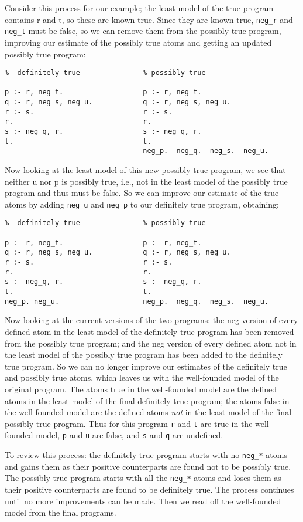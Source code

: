 Consider this process for our example; the least model of the true
program contains r and t, so these are known true.  Since they are
known true, \verb|neg_r| and \verb|neg_t| must be false, so we can
remove them from the possibly true program, improving our estimate of
the possibly true atoms and getting an updated possibly true program:
\begin{verbatim}
%  definitely true               % possibly true

p :- r, neg_t.                   p :- r, neg_t.
q :- r, neg_s, neg_u.            q :- r, neg_s, neg_u.
r :- s.                          r :- s.
r.                               r.
s :- neg_q, r.                   s :- neg_q, r.
t.                               t.
                                 neg_p.  neg_q.  neg_s.  neg_u.
\end{verbatim}
Now looking at the least model of this new possibly true program, we
see that neither u nor p is possibly true, i.e., not in the least
model of the possibly true program and thus must be false.  So we can
improve our estimate of the true atoms by adding \verb|neg_u| and
\verb|neg_p| to our definitely true program, obtaining:
\begin{verbatim}
%  definitely true               % possibly true

p :- r, neg_t.                   p :- r, neg_t.
q :- r, neg_s, neg_u.            q :- r, neg_s, neg_u.
r :- s.                          r :- s.
r.                               r.
s :- neg_q, r.                   s :- neg_q, r.
t.                               t.
neg_p. neg_u.                    neg_p.  neg_q.  neg_s.  neg_u.
\end{verbatim}
Now looking at the current versions of the two programs: the neg
version of every defined atom in the least model of the definitely
true program has been removed from the possibly true program; and the
neg version of every defined atom not in the least model of the
possibly true program has been added to the definitely true program.
So we can no longer improve our estimates of the definitely true and
possibly true atoms, which leaves us with the well-founded model of
the original program.  The atoms true in the well-founded model are
the defined atoms in the least model of the final definitely true
program; the atoms false in the well-founded model are the defined
atoms {\em not} in the least model of the final possibly true program.
Thus for this program \verb|r| and \verb|t| are true in the
well-founded model, \verb|p| and \verb|u| are false, and \verb|s| and
\verb|q| are undefined.

To review this process: the definitely true program starts with no
\verb|neg_*| atoms and gains them as their positive counterparts are
found not to be possibly true.  The possibly true program starts with
all the \verb|neg_*| atoms and loses them as their positive
counterparts are found to be definitely true.  The process continues
until no more improvements can be made.  Then we read off the
well-founded model from the final programs.

